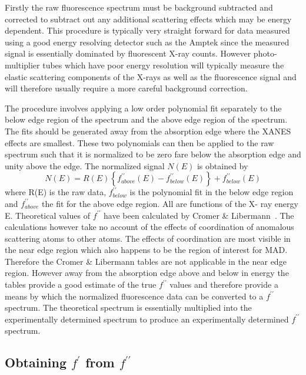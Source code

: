 \documentclass[a4]{article}
\begin{document}
Firstly the raw fluorescence spectrum must be background subtracted
and corrected to subtract out any additional scattering effects which
may be energy dependent. This procedure is typically very straight
forward for data measured using a good energy resolving detector such
as the Amptek since the measured signal is essentially dominated by
fluorescent X-ray counts.  However photo-multiplier tubes which have
poor energy resolution will typically measure the elastic scattering
components of the X-rays as well as the fluorescence signal and will
therefore usually require a more careful background correction. 

The procedure involves applying a low order polynomial fit separately
to the below edge region of the spectrum and the above edge region of
the spectrum. The fits should be generated away from the absorption
edge where the XANES effects are smallest. These two polynomials can
then be applied to the raw spectrum such that it is normalized to be
zero fare below the absorption edge and unity above the edge. The
normalized signal $N(E)$ is obtained by
\begin{equation}
N(E) = R(E) \left\{ f^{\prime\prime}_{above}(E)-f^{\prime\prime}_{below}(E) \right \} 
              + f^{\prime\prime}_{below}(E)
\end{equation}
 where R(E) is the raw data, $f^{\prime\prime}_{below}$ is the
polynomial fit in the below edge region and $f^{\prime\prime}_{above}$
the fit for the above edge region. All are functions of the X- ray
energy E.  Theoretical values of $f^{\prime\prime}$ have been
calculated by Cromer \& Libermann~\cite{CromLiberA}. The calculations
however take no account of the effects of coordination of anomalous
scattering atoms to other atoms. The effects of coordination are most
visible in the near edge region which also happens to be the region of
interest for MAD. Therefore the Cromer \& Libermann tables are not
applicable in the near edge region. However away from the absorption
edge above and below in energy the tables provide a good estimate of
the true $f^{\prime\prime}$ values and therefore provide a means by
which the normalized fluorescence data can be converted to a
$f^{\prime\prime}$ spectrum.  The theoretical spectrum is essentially
multiplied into the experimentally determined spectrum to produce an
experimentally determined $f^{\prime\prime}$ spectrum.  

\subsection{Obtaining $f^{\prime}$ from $f^{\prime\prime}$}
\end{document}
